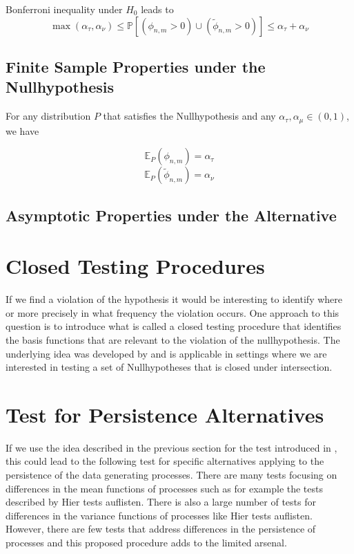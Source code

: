 \documentclass[12pt, a4paper]{article}
\theoremstyle{MAstyle} \newtheorem{assumption}{Assumption}[section]
\theoremstyle{MAstyle} \newtheorem{definition}{Definition}[section]
\theoremstyle{MAstyle} \newtheorem{theorem}{Theorem}[section]
\begin{document}
			Bonferroni inequality under $H_0$ leads to
			\begin{equation}
				\max(\alpha_{\tau}, \alpha_{\nu}) \leq \mathbb{P}\left[(\phi_{n,m} > 0) \cup (\tilde{\phi}_{n,m} > 0)\right] \leq \alpha_{\tau} + \alpha_{\nu}
			\end{equation}
		
		\subsection{Finite Sample Properties under the Nullhypothesis}
		For any distribution $P$ that satisfies the Nullhypothesis and any $\alpha_{\tau}, \alpha_{\mu} \in (0,1)$, we have 
		\begin{multicols}{2}
			\noindent
			\begin{equation*}
				\mathbb{E}_P\left(\phi_{n,m}\right) = \alpha_{\tau}
			\end{equation*}			
			\begin{equation}
				\mathbb{E}_P\left(\tilde{\phi}_{n,m}\right) = \alpha_{\nu}
			\end{equation}
		\end{multicols}
		
		\subsection{Asymptotic Properties under the Alternative}
		
	\section{Closed Testing Procedures}\label{closed_testing}
		If we find a violation of the hypothesis it would be interesting to identify where or more precisely in what frequency the violation occurs. One approach to this question is to introduce what is called a closed testing procedure that identifies the basis functions that are relevant to the violation of the nullhypothesis. The underlying idea was developed by \cite{marcus_closed_1976} and is applicable in settings where we are interested in testing a set of Nullhypotheses that is closed under intersection.
		
	\section{Test for Persistence Alternatives}\label{closed_persistence_test}
		If we use the idea described in the previous section for the test introduced in \cite{bugni_permutation_2021}, this could lead to the following test for specific alternatives applying to the persistence of the data generating processes. There are many tests focusing on differences in the mean functions of processes such as for example the tests described by {\color{red} Hier tests auflisten}. There is also a large number of tests for differences in the variance functions of processes like {\color{red} Hier tests auflisten}. However, there are few tests that address differences in the persistence of processes and this proposed procedure adds to the limited arsenal.\\
		
\end{document}
